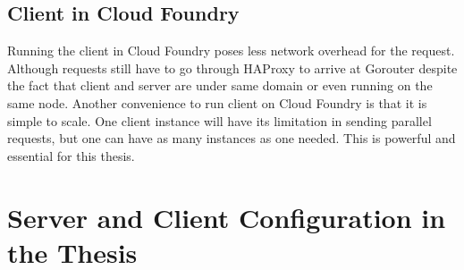 \subsection{Client in Cloud Foundry}
Running the client in Cloud Foundry poses less network overhead for the request. Although requests still have to go through HAProxy to arrive at Gorouter despite the fact that client and server are under same domain or even running on the same node. Another convenience to run client on Cloud Foundry is that it is simple to scale. One client instance will have its limitation in sending parallel requests, but one can have as many instances as one needed. This is powerful and essential for this thesis. 

\section{Server and Client Configuration in the Thesis}


